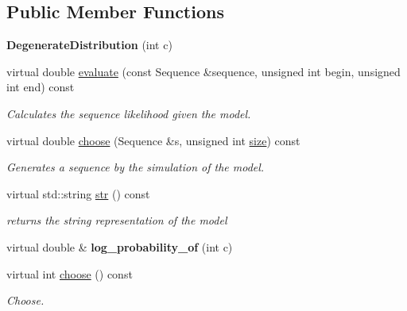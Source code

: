 \subsection*{Public Member Functions}
\begin{DoxyCompactItemize}
\item 
\mbox{\label{classtops_1_1DegenerateDistribution_aab108d57cf25544ae2afd68939c69329}} 
{\bfseries Degenerate\+Distribution} (int c)
\item 
\mbox{\label{classtops_1_1DegenerateDistribution_a08aef108f6ede16a15ebeac9e81afbde}} 
virtual double \hyperlink{classtops_1_1DegenerateDistribution_a08aef108f6ede16a15ebeac9e81afbde}{evaluate} (const Sequence \&sequence, unsigned int begin, unsigned int end) const
\begin{DoxyCompactList}\small\item\em Calculates the sequence likelihood given the model. \end{DoxyCompactList}\item 
\mbox{\label{classtops_1_1DegenerateDistribution_aefd0aff98e9b81510550688038d0f9dc}} 
virtual double \hyperlink{classtops_1_1DegenerateDistribution_aefd0aff98e9b81510550688038d0f9dc}{choose} (Sequence \&s, unsigned int \hyperlink{classtops_1_1DiscreteIIDModel_aa486a4a7ba0b77de10160eddce2c8ef5}{size}) const
\begin{DoxyCompactList}\small\item\em Generates a sequence by the simulation of the model. \end{DoxyCompactList}\item 
\mbox{\label{classtops_1_1DegenerateDistribution_a04c33d3d4992195d27bb6a087b1f487a}} 
virtual std\+::string \hyperlink{classtops_1_1DegenerateDistribution_a04c33d3d4992195d27bb6a087b1f487a}{str} () const
\begin{DoxyCompactList}\small\item\em returns the string representation of the model \end{DoxyCompactList}\item 
\mbox{\label{classtops_1_1DegenerateDistribution_acec7ad29c607ac20f230569324275847}} 
virtual double \& {\bfseries log\+\_\+probability\+\_\+of} (int c)
\item 
\mbox{\label{classtops_1_1DegenerateDistribution_a86f4898dc1294c4ee80d183403b4a686}} 
virtual int \hyperlink{classtops_1_1DegenerateDistribution_a86f4898dc1294c4ee80d183403b4a686}{choose} () const
\begin{DoxyCompactList}\small\item\em Choose. \end{DoxyCompactList}\end{DoxyCompactItemize}
